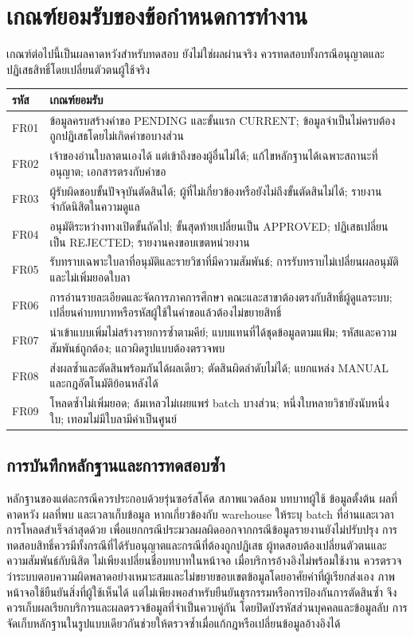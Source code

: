 \section{เกณฑ์ยอมรับของข้อกำหนดการทำงาน}
เกณฑ์ต่อไปนี้เป็นผลคาดหวังสำหรับทดสอบ ยังไม่ใช่ผลผ่านจริง ควรทดสอบทั้งกรณีอนุญาตและปฏิเสธสิทธิ์โดยเปลี่ยนตัวตนผู้ใช้จริง
\begin{tabularx}{\textwidth}{|p{16mm}|X|}
\hline
รหัส & เกณฑ์ยอมรับ \\ \hline
FR01 & ข้อมูลครบสร้างคำขอ PENDING และขั้นแรก CURRENT; ข้อมูลจำเป็นไม่ครบต้องถูกปฏิเสธโดยไม่เกิดคำขอบางส่วน \\ \hline
FR02 & เจ้าของอ่านใบลาตนเองได้ แต่เข้าถึงของผู้อื่นไม่ได้; แก้ไขหลักฐานได้เฉพาะสถานะที่อนุญาต; เอกสารตรงกับคำขอ \\ \hline
FR03 & ผู้รับผิดชอบขั้นปัจจุบันตัดสินได้; ผู้ที่ไม่เกี่ยวข้องหรือยังไม่ถึงขั้นตัดสินไม่ได้; รายงานจำกัดนิสิตในความดูแล \\ \hline
FR04 & อนุมัติระหว่างทางเปิดขั้นถัดไป; ขั้นสุดท้ายเปลี่ยนเป็น APPROVED; ปฏิเสธเปลี่ยนเป็น REJECTED; รายงานคงขอบเขตหน่วยงาน \\ \hline
FR05 & รับทราบเฉพาะใบลาที่อนุมัติและรายวิชาที่มีความสัมพันธ์; การรับทราบไม่เปลี่ยนผลอนุมัติและไม่เพิ่มยอดใบลา \\ \hline
FR06 & การอ่านรายละเอียดและจัดการภาคการศึกษา คณะและสาขาต้องตรงกับสิทธิ์ผู้ดูแลระบบ; เปลี่ยนค่าบทบาทหรือรหัสผู้ใช้ในคำขอแล้วต้องไม่ขยายสิทธิ์ \\ \hline
FR07 & นำเข้าแบบเพิ่มไม่สร้างรายการซ้ำตามคีย์; แบบแทนที่ได้ชุดข้อมูลตามแฟ้ม; รหัสและความสัมพันธ์ถูกต้อง; แถวผิดรูปแบบต้องตรวจพบ \\ \hline
FR08 & ส่งผลซ้ำและตัดสินพร้อมกันได้ผลเดียว; ตัดสินผิดลำดับไม่ได้; แยกแหล่ง MANUAL และกฎอัตโนมัติย้อนหลังได้ \\ \hline
FR09 & โหลดซ้ำไม่เพิ่มยอด; ล้มเหลวไม่เผยแพร่ batch บางส่วน; หนึ่งใบหลายวิชายังนับหนึ่งใบ; เทอมไม่มีใบลามีค่าเป็นศูนย์ \\ \hline
\end{tabularx}
\subsection{การบันทึกหลักฐานและการทดสอบซ้ำ}
หลักฐานของแต่ละกรณีควรประกอบด้วยรุ่นซอร์สโค้ด สภาพแวดล้อม บทบาทผู้ใช้ ข้อมูลตั้งต้น ผลที่คาดหวัง ผลที่พบ และเวลาเก็บข้อมูล หากเกี่ยวข้องกับ warehouse ให้ระบุ batch ที่อ่านและเวลาการโหลดสำเร็จล่าสุดด้วย เพื่อแยกกรณีประมวลผลผิดออกจากกรณีข้อมูลรายงานยังไม่ปรับปรุง
การทดสอบสิทธิ์ควรมีทั้งกรณีที่ได้รับอนุญาตและกรณีที่ต้องถูกปฏิเสธ ผู้ทดสอบต้องเปลี่ยนตัวตนและความสัมพันธ์กับนิสิต ไม่เพียงเปลี่ยนชื่อบทบาทในหน้าจอ เมื่อบริการอ้างอิงไม่พร้อมใช้งาน ควรตรวจว่าระบบตอบความผิดพลาดอย่างเหมาะสมและไม่ขยายขอบเขตข้อมูลโดยอาศัยค่าที่ผู้เรียกส่งเอง
ภาพหน้าจอใช้ยืนยันสิ่งที่ผู้ใช้เห็นได้ แต่ไม่เพียงพอสำหรับยืนยันธุรกรรมหรือการป้องกันการตัดสินซ้ำ จึงควรเก็บผลเรียกบริการและผลตรวจข้อมูลที่จำเป็นควบคู่กัน โดยปิดบังรหัสส่วนบุคคลและข้อมูลลับ การจัดเก็บหลักฐานในรูปแบบเดียวกันช่วยให้ตรวจซ้ำเมื่อแก้กฎหรือเปลี่ยนข้อมูลอ้างอิงได้
